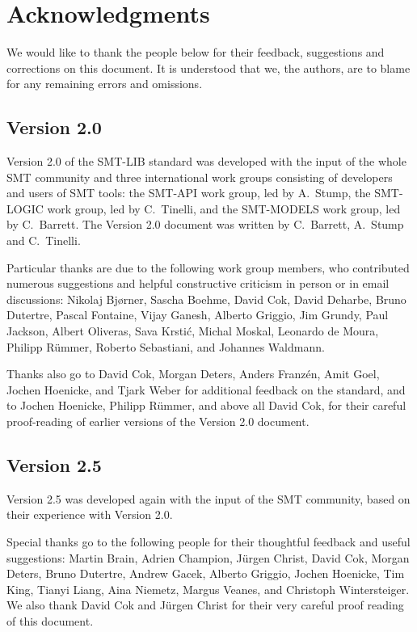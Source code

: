 
\chapter*{Acknowledgments}

\thispagestyle{empty}

We would like to thank the people below for their feedback, suggestions and corrections
on this document.
It is understood that we, the authors, are to blame for any remaining errors
and omissions.


\section*{Version 2.0}

Version 2.0 of the SMT-LIB standard was developed with the input of 
the whole SMT community and
three international work groups consisting of developers and users of SMT tools:
the SMT-API work group, led by A.~Stump,
the SMT-LOGIC work group, led by C.~Tinelli, and
the SMT-MODELS work group, led by C.~Barrett.
The Version 2.0 document was written by  C.~Barrett, A.~Stump and C.~Tinelli.

Particular thanks are due to the following work group members, 
who contributed numerous suggestions and helpful constructive criticism 
in person or in email discussions:
Nikolaj Bj{\o}rner, 
Sascha Boehme, 
David Cok, 
David Deharbe, 
Bruno Dutertre,
Pascal Fontaine,
Vijay Ganesh,
Alberto Griggio,
Jim Grundy,
Paul Jackson, 
Albert Oliveras, 
Sava Krsti\'c,
Michal Moskal, 
Leonardo de Moura,
Philipp R\"ummer,
Roberto Sebastiani,
and
Johannes Waldmann.

Thanks also go to
David Cok,
Morgan Deters,
Anders Franz\'en,
Amit Goel,
Jochen Hoenicke,
and
Tjark Weber
for additional feedback on the standard,
and to Jochen Hoenicke, Philipp R\"ummer,
and above all David Cok,
for their careful proof-reading of earlier versions of the Version 2.0 document.

\section*{Version 2.5}

Version 2.5 was developed again with the input of the SMT community, 
based on their experience with Version 2.0.

Special thanks go to the following people
for their thoughtful feedback and useful suggestions:
Martin Brain,
Adrien Champion,
J\"{u}rgen Christ,
David Cok,
Morgan Deters,
Bruno Dutertre,
Andrew Gacek,
Alberto Griggio,
Jochen Hoenicke,
Tim King,
Tianyi Liang,
Aina Niemetz,
Margus Veanes,
and
Christoph Wintersteiger.
We also thank David Cok and J\"{u}rgen Christ for their very careful 
proof reading of this document.


